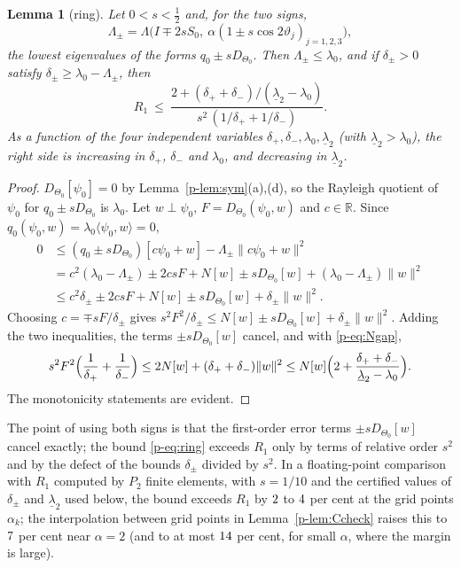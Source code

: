 \documentclass[11pt]{article}
\newtheorem{lemma}[theorem]{Lemma}
\theoremstyle{remark}
\newcommand{\R}{\mathbb{R}}
\begin{document}
\begin{lemma}[ring]\label{p-lem:ring}
Let $0<s<\frac12$ and, for the two signs,
\[
  \Lambda_\pm=\Lambda\bigl(I\mp2sS_0,\ \alpha(1\pm s\cos2\vartheta_j)_{j=1,2,3}\bigr),
\]
the lowest eigenvalues of the forms $q_0\pm sD_{\Theta_0}$. Then $\Lambda_\pm\le\lambda_0$, and
if $\delta_\pm>0$ satisfy $\delta_\pm\ge\lambda_0-\Lambda_\pm$, then
\begin{equation}\label{p-eq:ring}
  R_1\ \le\ \frac{2+(\delta_++\delta_-)/(\underline\lambda_2-\lambda_0)}
  {s^2\,(1/\delta_++1/\delta_-)} .
\end{equation}
As a function of the four independent variables $\delta_+,\delta_-,\lambda_0,\underline\lambda_2$
(with $\underline\lambda_2>\lambda_0$), the right side is increasing in $\delta_+$, $\delta_-$ and
$\lambda_0$, and decreasing in $\underline\lambda_2$.
\end{lemma}

\begin{proof}
$D_{\Theta_0}[\psi_0]=0$ by Lemma~\ref{p-lem:sym}(a),(d), so the Rayleigh quotient of $\psi_0$ for
$q_0\pm sD_{\Theta_0}$ is $\lambda_0$. Let $w\perp\psi_0$, $F=D_{\Theta_0}(\psi_0,w)$ and
$c\in\R$. Since $q_0(\psi_0,w)=\lambda_0\langle\psi_0,w\rangle=0$,
\begin{align*}
  0&\le(q_0\pm sD_{\Theta_0})[c\psi_0+w]-\Lambda_\pm\|c\psi_0+w\|^2\\
  &=c^2(\lambda_0-\Lambda_\pm)\pm2csF+N[w]\pm sD_{\Theta_0}[w]+(\lambda_0-\Lambda_\pm)\|w\|^2\\
  &\le c^2\delta_\pm\pm2csF+N[w]\pm sD_{\Theta_0}[w]+\delta_\pm\|w\|^2 .
\end{align*}
Choosing $c=\mp sF/\delta_\pm$ gives
$s^2F^2/\delta_\pm\le N[w]\pm sD_{\Theta_0}[w]+\delta_\pm\|w\|^2$. Adding the two
inequalities, the terms $\pm sD_{\Theta_0}[w]$ cancel, and with \eqref{p-eq:Ngap},
\[
  s^2F^2\Bigl(\frac1{\delta_+}+\frac1{\delta_-}\Bigr)\le2N[w]+(\delta_++\delta_-)\|w\|^2
  \le N[w]\Bigl(2+\frac{\delta_++\delta_-}{\underline\lambda_2-\lambda_0}\Bigr).
\]
The monotonicity statements are evident.
\end{proof}

The point of using both signs is that the first-order error terms $\pm sD_{\Theta_0}[w]$
cancel exactly; the bound \eqref{p-eq:ring} exceeds $R_1$ only by terms of relative order $s^2$
and by the defect of the bounds $\delta_\pm$ divided by $s^2$. In a floating-point comparison
with $R_1$ computed by $P_2$ finite elements, with $s=1/10$ and the certified values of $\delta_\pm$
and $\underline\lambda_2$ used below, the bound exceeds $R_1$ by $2$ to $4$ per cent
at the grid points $\alpha_k$; the interpolation between grid points in Lemma~\ref{p-lem:Ccheck} raises
this to $7$ per cent near $\alpha=2$ (and to at most $14$ per cent, for small $\alpha$,
where the margin is large).
\end{document}
